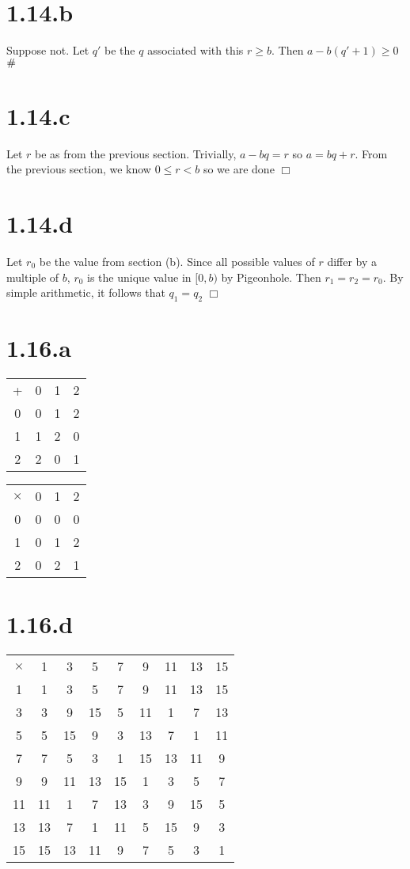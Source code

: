 \documentclass{article}
\newcommand{\contra}{\raisebox{\depth}{\#}}
\begin{document}
\section*{1.14.b}
Suppose not. Let $q'$ be the $q$ associated with this $r\geqslant b$. Then $a-b(q'+1) \geqslant 0$ $\contra$

\section*{1.14.c}
Let $r$ be as from the previous section. Trivially, $a - bq = r$ so $a = bq + r$. From the previous section, we know $0 \leqslant r < b$ so we are done $\Box$

\section*{1.14.d}
Let $r_0$ be the value from section (b). Since all possible values of $r$ differ by a multiple of $b$, $r_0$ is the unique value in $[0,b)$ by Pigeonhole. Then $r_1 = r_2 = r_0$. By simple arithmetic, it follows that $q_1 = q_2$ $\Box$

\section*{1.16.a}
\begin{tabular}{|c||c|c|c|}
\hline
+ & 0 & 1 & 2\\
\hhline{|=#=|=|=|}
0 & 0 & 1 & 2\\
\hline
1 & 1 & 2 & 0\\
\hline
2 & 2 & 0 & 1\\
\hline
\end{tabular}
\begin{tabular}{|c||c|c|c|}
\hline
$\times$ & 0 & 1 & 2\\
\hhline{|=#=|=|=|}
0 & 0 & 0 & 0\\
\hline
1 & 0 & 1 & 2\\
\hline
2 & 0 & 2 & 1\\
\hline
\end{tabular}

\section*{1.16.d}
\begin{tabular}{|c||c|c|c|c|c|c|c|c|}
\hline
$\times$ & 1 & 3 & 5 & 7 & 9 & 11 & 13 & 15\\
\hhline{|=#=|=|=|=|=|=|=|=|}
1 & 1 & 3 & 5 & 7 & 9 & 11 & 13 & 15\\
\hline
3 & 3 & 9 & 15 & 5 & 11 & 1 & 7 & 13\\
\hline
5 & 5 & 15 & 9 & 3 & 13 & 7 & 1 & 11\\
\hline
7 & 7 & 5 & 3 & 1 & 15 & 13 & 11 & 9\\
\hline
9 & 9 & 11 & 13 & 15 & 1 & 3 & 5 & 7\\
\hline
11 & 11 & 1 & 7 & 13 & 3 & 9 & 15 & 5\\
\hline
13 & 13 & 7 & 1 & 11 & 5 & 15 & 9 & 3\\
\hline
15 & 15 & 13 & 11 & 9 & 7 & 5 & 3 & 1\\
\hline
\end{tabular}
\end{document}
